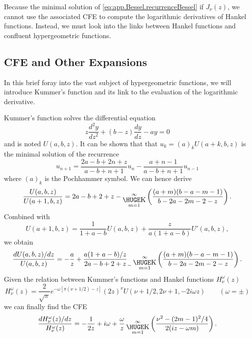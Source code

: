 Because the minimal solution of \eqref{eq:app.Bessel.recurrenceBessel} if $J_\nu(z)$, 
we cannot use the associated CFE to compute the logarithmic derivatives
of Hankel functions. Instead, we must look into the links between
Hankel functions and confluent hypergeometric functions. 

\subsection{CFE and Other Expansions}
In this brief foray into the vast subject
of hypergeometric functions, we will introduce Kummer's 
function and its link to the evaluation of the logarithmic
derivative.

Kummer's function solves the differential equation \cite[\S13.1.1]{ABR1965}
  \begin{equation}
    z\frac{d^2y}{dz^2}+(b-z)\frac{dy}{dz}-ay=0
  \end{equation}
and is noted $U(a,b,z)$. It can be shown that that $u_k=(a)_kU(a+k,b,z)$
is the minimal solution of the recurrence \cite{TEM1983}
  \begin{equation}
    u_{n+1} = \frac{2a-b+2n+z}{a-b+n+1}u_n - \frac{a+n-1}{a-b+n+1}u_{n-1}
  \end{equation}
where $(a)_k$ is the Pochhammer symbol. We can hence derive
  \begin{equation}
    \frac{U(a,b,z)}{U(a+1,b,z)} = 2a-b+2+z-\bigk_{m=1}^\infty\left(\frac{(a+m)(b-a-m-1)}{b-2a-2m-2-z}\right).
  \end{equation}
Combined with \cite[\S13.4.23]{ABR1965}
  \begin{equation}
    U(a+1,b,z) = \frac{1}{1+a-b}U(a,b,z) + \frac{z}{a(1+a-b)}U'(a,b,z), 
  \end{equation}
we obtain \cite{CUY2008}
  \begin{equation}
    \frac{dU(a,b,z)/dz}{U(a,b,z)} = -\frac{a}{z}+\frac{a(1+a-b)/z}{2a-b+2+z}_{-}\bigk_{m=1}^\infty\left(\frac{(a+m)(b-a-m-1)}{b-2a-2m-2-z}\right).
  \end{equation}
Given the relation between Kummer's functions and Hankel functions $H^\omega_{\nu}(z)$ \cite[\S13.6.22/23]{ABR1965}
  \begin{equation}
    H^\omega_\nu(z) = \frac{2}{\sqrt{\pi}}e^{-\omega\left[\pi\left(\nu+1/2\right)-z\right]}(2z)^\nu U(\nu+1/2,2\nu+1,-2i\omega z)\qquad (\omega=\pm)
  \end{equation}
we can finally find the CFE
  \begin{equation}
    \label{eq:app.numTools.cfeHankel}
    \frac{dH^\omega_\nu(z)/dz}{H^\omega_\nu(z)} = -\frac{1}{2z}+i\omega+\frac{\omega}{z}\bigk_{m=1}^\infty\left(\frac{\nu^2-(2m-1)^2/4}{2(iz-\omega m)}\right).
  \end{equation}
